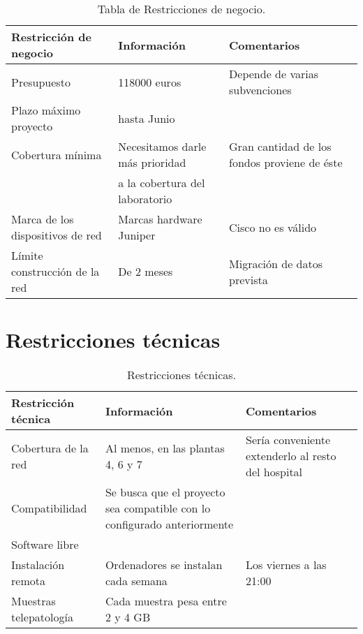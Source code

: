 \begin{table}[H]
	\begin{center}
		\begin{tabular}{|l|l|l|}
			\hline 
			Restricción de negocio & Información & Comentarios \\ 
			\hline \hline
			Presupuesto & 118000 euros & Depende de varias subvenciones \\ \hline
			Plazo máximo proyecto & hasta Junio & \\ \hline
			Cobertura mínima & Necesitamos darle más prioridad  & Gran cantidad de los fondos proviene de éste \\ 
			 & a la cobertura del laboratorio &  \\ \hline
			Marca de los dispositivos de red & Marcas hardware Juniper & Cisco no es válido\\ \hline
			Límite construcción de la red & De 2 meses & Migración de datos prevista \\ \hline
		\end{tabular}
		\caption{Tabla de Restricciones de negocio.}
		\label{tabla:tabla1}
	\end{center}
\end{table}

\section{Restricciones técnicas}

\begin{table}[H]
	\begin{center}
		\begin{tabular}{|l|l|l|}
			\hline 
			Restricción técnica & Información & Comentarios \\ 
			\hline \hline
			Cobertura de la red & Al menos, en las plantas 4, 6 y 7 & Sería conveniente extenderlo al resto del hospital \\ \hline
			Compatibilidad & Se busca que el proyecto sea compatible con lo configurado anteriormente & \\ \hline
			Software libre &  & \\ \hline
			Instalación remota & Ordenadores se instalan cada semana & Los viernes a las 21:00 \\ \hline
			Muestras telepatología & Cada muestra pesa entre 2 y 4 GB & \\ \hline		
		\end{tabular}
		\caption{Restricciones técnicas.}
		\label{tabla:tabla2}
	\end{center}
\end{table}

